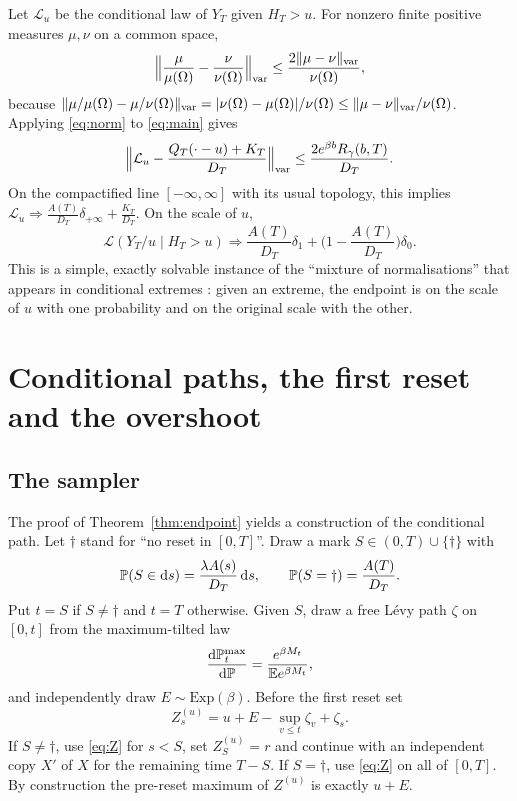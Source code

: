 \documentclass[11pt,a4paper]{article}
\begin{document}
Let $\mathcal L_u$ be the conditional law of $Y_T$ given $H_T>u$. For nonzero finite positive measures $\mu,\nu$ on a common space,
\begin{equation}\label{eq:norm}
 \Big\|\frac{\mu}{\mu(\Omega)}-\frac{\nu}{\nu(\Omega)}\Big\|_{\mathrm{var}}\le\frac{2\|\mu-\nu\|_{\mathrm{var}}}{\nu(\Omega)},
\end{equation}
because $\|\mu/\mu(\Omega)-\mu/\nu(\Omega)\|_{\mathrm{var}}=|\nu(\Omega)-\mu(\Omega)|/\nu(\Omega)\le\|\mu-\nu\|_{\mathrm{var}}/\nu(\Omega)$. Applying \eqref{eq:norm} to \eqref{eq:main} gives
\begin{equation}\label{eq:condend}
 \Big\|\mathcal L_u-\frac{Q_T(\cdot-u)+K_T}{D_T}\Big\|_{\mathrm{var}}\le\frac{2e^{\beta b}R_\gamma(b,T)}{D_T}.
\end{equation}
On the compactified line $[-\infty,\infty]$ with its usual topology, this implies $\mathcal L_u\Rightarrow\frac{A(T)}{D_T}\delta_{+\infty}+\frac{K_T}{D_T}$. On the scale of $u$,
\begin{equation}\label{eq:scale}
 \mathcal L(Y_T/u\mid H_T>u)\Rightarrow\frac{A(T)}{D_T}\delta_1+\Big(1-\frac{A(T)}{D_T}\Big)\delta_0 .
\end{equation}
This is a simple, exactly solvable instance of the ``mixture of normalisations'' that appears in conditional extremes \cite{PCT2025}: given an extreme, the endpoint is on the scale of $u$ with one probability and on the original scale with the other.

\section{Conditional paths, the first reset and the overshoot}\label{sec:paths}

\subsection{The sampler}
The proof of Theorem~\ref{thm:endpoint} yields a construction of the conditional path. Let $\dagger$ stand for ``no reset in $[0,T]$''. Draw a mark $S\in(0,T)\cup\{\dagger\}$ with
\begin{equation}\label{eq:mark}
 \mathbb P(S\in\mathrm ds)=\frac{\lambda A(s)}{D_T}\,\mathrm d s,\qquad \mathbb P(S=\dagger)=\frac{A(T)}{D_T}.
\end{equation}
Put $t=S$ if $S\neq\dagger$ and $t=T$ otherwise. Given $S$, draw a free L\'evy path $\zeta$ on $[0,t]$ from the maximum-tilted law
\begin{equation}\label{eq:tilt}
 \frac{\mathrm d\mathbb P^{\max}_t}{\mathrm d\mathbb P}=\frac{e^{\beta M_t}}{\mathbb E e^{\beta M_t}},
\end{equation}
and independently draw $E\sim\mathrm{Exp}(\beta)$. Before the first reset set
\begin{equation}\label{eq:Z}
 Z^{(u)}_s=u+E-\sup_{v\le t}\zeta_v+\zeta_s .
\end{equation}
If $S\neq\dagger$, use \eqref{eq:Z} for $s<S$, set $Z^{(u)}_S=r$ and continue with an independent copy $X'$ of $X$ for the remaining time $T-S$. If $S=\dagger$, use \eqref{eq:Z} on all of $[0,T]$. By construction the pre-reset maximum of $Z^{(u)}$ is exactly $u+E$.
\end{document}
